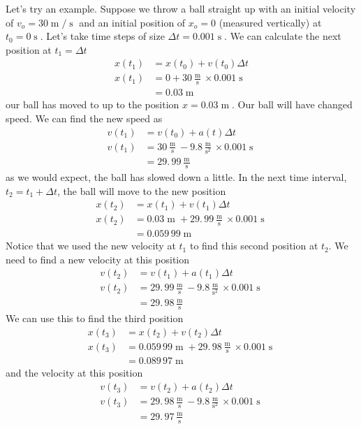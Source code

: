 \documentclass{book}
\begin{document}
Let's try an example. Suppose we throw a ball straight up with an initial
velocity of $v_{o}=30 \operatorname{m} / \operatorname{s} $ and an initial position of $x_{o}=0$ (measured vertically) at $t_{0}=0 \operatorname{s} .$ Let's take time steps of size $\Delta t=0.001 \operatorname{s} .$ We can calculate the next position at $t_{1}=\Delta t$ 
\begin{align*}
x(t_{1})  & =x(t_{0})+v(t_{0})\Delta t\\
x(t_{1})  & =0+30\frac{ \operatorname{m} }{ \operatorname{s} }\times0.001 \operatorname{s} \\
& =0.03 \operatorname{m} \end{align*}
our ball has moved to up to the position $x=0.03 \operatorname{m} .$ Our ball will have changed speed. We can find the new speed as
\begin{align*}
v(t_{1})  & =v(t_{0})+a(t)\Delta t\\
v(t_{1})  & =30\frac{ \operatorname{m} }{ \operatorname{s} }-9.8\frac{ \operatorname{m} }{ \operatorname{s} ^{2}}\times0.001 \operatorname{s} \\
& =29.\,\allowbreak99\frac{ \operatorname{m} }{ \operatorname{s} } \end{align*}
as we would expect, the ball has slowed down a little. In the next time
interval, $t_{2}=t_{1}+\Delta t$, the ball will move to the new position
\begin{align*}
x(t_{2})  & =x(t_{1})+v(t_{1})\Delta t\\
x(t_{2})  & =0.03 \operatorname{m} +29.\,\allowbreak99\frac{ \operatorname{m} }{ \operatorname{s} }\times0.001 \operatorname{s} \\
& =0.059\,99 \operatorname{m} \end{align*}
Notice that we used the new velocity at $t_{1}$ to find this second position
at $t_{2}$. We need to find a new velocity at this position
\begin{align*}
v(t_{2})  & =v(t_{1})+a(t_{1})\Delta t\\
v(t_{2})  & =29.\,\allowbreak99\frac{ \operatorname{m} }{ \operatorname{s} }-9.8\frac{ \operatorname{m} }{ \operatorname{s} ^{2}}\times0.001 \operatorname{s} \\
& =29.\,\allowbreak98\frac{ \operatorname{m} }{ \operatorname{s} } \end{align*}
We can use this to find the third position 
\begin{align*}
x(t_{3})  & =x(t_{2})+v(t_{2})\Delta t\\
x(t_{3})  & =0.059\,99 \operatorname{m} +29.\,\allowbreak98\frac{ \operatorname{m} }{ \operatorname{s} }\times0.001 \operatorname{s} \\
& =0.089\,97 \operatorname{m} \end{align*}
and the velocity at this position \begin{align*}
v(t_{3})  & =v(t_{2})+a(t_{2})\Delta t\\
v(t_{3})  & =29.\,\allowbreak98\frac{ \operatorname{m} }{ \operatorname{s} }-9.8\frac{ \operatorname{m} }{ \operatorname{s} ^{2}}\times0.001 \operatorname{s} \\
& =29.\,\allowbreak97\frac{ \operatorname{m} }{ \operatorname{s} } \end{align*}
\end{document}
